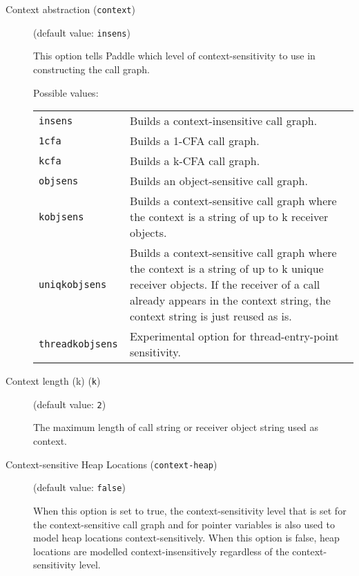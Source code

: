 \documentclass{article}
\begin{document}
\begin{description}

\item[Context abstraction ({\tt context})]
(default value: {\tt insens})




This option tells Paddle which level of context-sensitivity to use in constructing the call graph.




Possible values:\\
\begin{longtable}{p{1in}p{4in}}

{\tt insens }
&

Builds a context-insensitive call graph.
\\

{\tt 1cfa }
&

Builds a 1-CFA call graph.
\\

{\tt kcfa }
&

Builds a k-CFA call graph.
\\

{\tt objsens }
&

Builds an object-sensitive call graph.
\\

{\tt kobjsens }
&

Builds a context-sensitive call graph where the context is a string of up to
k receiver objects.
\\

{\tt uniqkobjsens }
&

Builds a context-sensitive call graph where the context is a string of up to
k unique receiver objects. If the receiver of a call already appears in the
context string, the context string is just reused as is.
\\

{\tt threadkobjsens }
&

Experimental option for thread-entry-point sensitivity.
\\

\end{longtable}


\item[Context length (k) ({\tt k})]
(default value: {\tt 2})




                                        The maximum length of call string or receiver object string used as context.
                


\item[Context-sensitive Heap Locations ({\tt context-heap})]
(default value: {\tt false})




When this option is set to true, the context-sensitivity level that is set
for the context-sensitive call graph and for pointer variables is also used
to model heap locations context-sensitively. When this option is false,
heap locations are modelled context-insensitively regardless of the
context-sensitivity level.
        


\end{description}
\end{document}
